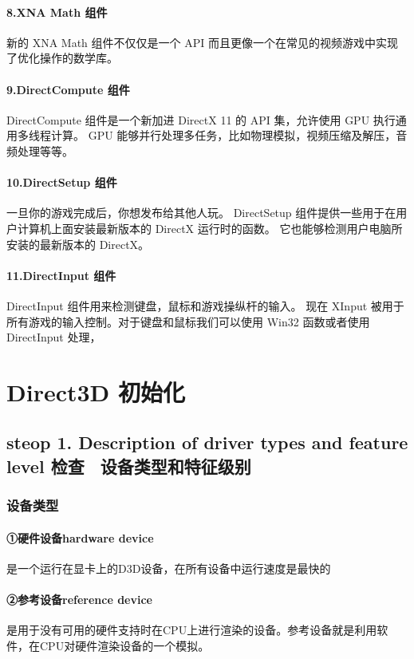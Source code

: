 \documentclass[UTF8,a4paper,8pt]{ctexart}
\begin{document}
			 \paragraph{8.XNA Math 组件}新的 XNA Math 组件不仅仅是一个 API 而且更像一个在常见的视频游戏中实现了优化操作的数学库。
			 
			 \paragraph{9.DirectCompute 组件}DirectCompute 组件是一个新加进 DirectX 11 的 API 集，允许使用 GPU 执行通用多线程计算。 GPU 能够并行处理多任务，比如物理模拟，视频压缩及解压，音频处理等等。
			 
			 \paragraph{10.DirectSetup 组件}一旦你的游戏完成后，你想发布给其他人玩。 DirectSetup 组件提供一些用于在用户计算机上面安装最新版本的 DirectX 运行时的函数。 它也能够检测用户电脑所安装的最新版本的 DirectX。
			 
			 \paragraph{11.DirectInput 组件}DirectInput 组件用来检测键盘，鼠标和游戏操纵杆的输入。 现在 XInput 被用于所有游戏的输入控制。对于键盘和鼠标我们可以使用 Win32 函数或者使用 DirectInput 处理，
\newpage 	
\section{Direct3D 初始化}
  
	\subsection*{steop 1. Description of driver types and feature level         检查 \ 设备类型和特征级别}
   
		\subsubsection*{设备类型}
  
			\paragraph{①硬件设备hardware device}是一个运行在显卡上的D3D设备，在所有设备中运行速度是最快的
	   
			\paragraph{②参考设备reference device}是用于没有可用的硬件支持时在CPU上进行渲染的设备。参考设备就是利用软件，在CPU对硬件渲染设备的一个模拟。
\end{document}
